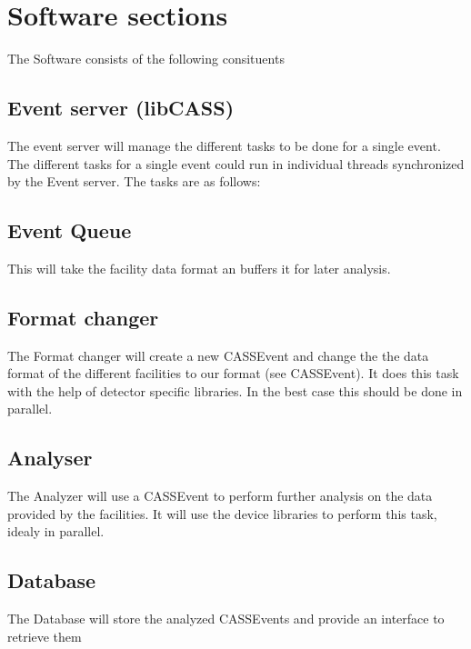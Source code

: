 \documentclass[11pt,a4paper,oneside]{article}
\begin{document}
\section{Software sections}
\label{sec:software-sections}

The Software consists of the following consituents

\subsection{Event server (libCASS)}
\label{sec:event-server}

The event server will manage the different tasks to be done for a single event. The different tasks for a single event could run in individual threads synchronized by the Event server.  The tasks are as follows: 

\subsection{Event Queue}
\label{sec:event-queue}

This will take the facility data format an buffers it for later analysis.

\subsection{Format changer}
\label{sec:format-changer}

The Format changer will create a new CASSEvent and change the the data format of the different facilities to our format (see CASSEvent). It does this task with the help of detector specific libraries. In the best case this should be done in parallel.

\subsection{Analyser}
\label{sec:analyzer}

The Analyzer will use a CASSEvent to perform further analysis on the data provided by the facilities. It will use the device libraries to perform this task, idealy in parallel.

\subsection{Database}
\label{sec:database}

The Database will store the analyzed CASSEvents and provide an interface to retrieve them
\end{document}
